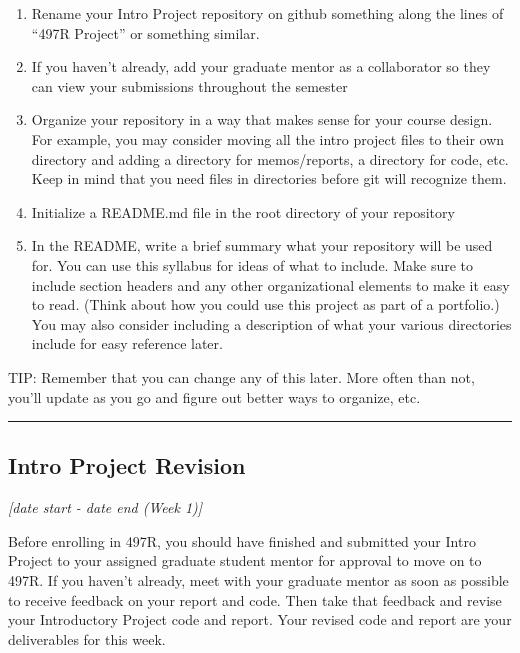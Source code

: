 \documentclass[12pt]{article}
\begin{document}
\begin{enumerate}
	\item Rename your Intro Project repository on github something along the lines of ``497R Project'' or something similar.
	\item If you haven't already, add your graduate mentor as a collaborator so they can view your submissions throughout the semester
	\item Organize your repository in a way that makes sense for your course design. For example, you may consider moving all the intro project files to their own directory and adding a directory for memos/reports, a directory for code, etc.  Keep in mind that you need files in directories before git will recognize them.
	\item Initialize a README.md file in the root directory of your repository
	\item In the README, write a brief summary what your repository will be used for.  You can use this syllabus for ideas of what to include.  Make sure to include section headers and any other organizational elements to make it easy to read. (Think about how you could use this project as part of a portfolio.) You may also consider including a description of what your various directories include for easy reference later.
\end{enumerate}

\noindent TIP:  Remember that you can change any of this later.
More often than not, you'll update as you go and figure out better ways to organize, etc.



\vspace{1em}\hrule\vspace{1em}
\subsection{Intro Project Revision}
\label{ssec:ipr}

\textit{[date start - date end (Week 1)]}
 
\bigskip
 
Before enrolling in 497R, you should have finished and submitted your Intro Project to your assigned graduate student mentor for approval to move on to 497R.
If you haven't already, meet with your graduate mentor as soon as possible to receive feedback on your report and code.  Then take that feedback and revise your Introductory Project code and report.  Your revised code and report are your deliverables for this week.
\end{document}
